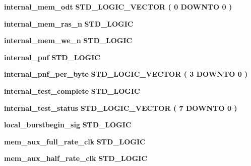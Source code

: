 \begin{DoxyCompactItemize}
\item 
{\bf internal\+\_\+mem\+\_\+odt} {\bfseries \textcolor{comment}{S\+T\+D\+\_\+\+L\+O\+G\+I\+C\+\_\+\+V\+E\+C\+T\+OR}\textcolor{vhdlchar}{ }\textcolor{vhdlchar}{(}\textcolor{vhdlchar}{ }\textcolor{vhdlchar}{ } \textcolor{vhdldigit}{0} \textcolor{vhdlchar}{ }\textcolor{keywordflow}{D\+O\+W\+N\+TO}\textcolor{vhdlchar}{ }\textcolor{vhdlchar}{ } \textcolor{vhdldigit}{0} \textcolor{vhdlchar}{ }\textcolor{vhdlchar}{)}\textcolor{vhdlchar}{ }} 
\item 
{\bf internal\+\_\+mem\+\_\+ras\+\_\+n} {\bfseries \textcolor{comment}{S\+T\+D\+\_\+\+L\+O\+G\+IC}\textcolor{vhdlchar}{ }} 
\item 
{\bf internal\+\_\+mem\+\_\+we\+\_\+n} {\bfseries \textcolor{comment}{S\+T\+D\+\_\+\+L\+O\+G\+IC}\textcolor{vhdlchar}{ }} 
\item 
{\bf internal\+\_\+pnf} {\bfseries \textcolor{comment}{S\+T\+D\+\_\+\+L\+O\+G\+IC}\textcolor{vhdlchar}{ }} 
\item 
{\bf internal\+\_\+pnf\+\_\+per\+\_\+byte} {\bfseries \textcolor{comment}{S\+T\+D\+\_\+\+L\+O\+G\+I\+C\+\_\+\+V\+E\+C\+T\+OR}\textcolor{vhdlchar}{ }\textcolor{vhdlchar}{(}\textcolor{vhdlchar}{ }\textcolor{vhdlchar}{ } \textcolor{vhdldigit}{3} \textcolor{vhdlchar}{ }\textcolor{keywordflow}{D\+O\+W\+N\+TO}\textcolor{vhdlchar}{ }\textcolor{vhdlchar}{ } \textcolor{vhdldigit}{0} \textcolor{vhdlchar}{ }\textcolor{vhdlchar}{)}\textcolor{vhdlchar}{ }} 
\item 
{\bf internal\+\_\+test\+\_\+complete} {\bfseries \textcolor{comment}{S\+T\+D\+\_\+\+L\+O\+G\+IC}\textcolor{vhdlchar}{ }} 
\item 
{\bf internal\+\_\+test\+\_\+status} {\bfseries \textcolor{comment}{S\+T\+D\+\_\+\+L\+O\+G\+I\+C\+\_\+\+V\+E\+C\+T\+OR}\textcolor{vhdlchar}{ }\textcolor{vhdlchar}{(}\textcolor{vhdlchar}{ }\textcolor{vhdlchar}{ } \textcolor{vhdldigit}{7} \textcolor{vhdlchar}{ }\textcolor{keywordflow}{D\+O\+W\+N\+TO}\textcolor{vhdlchar}{ }\textcolor{vhdlchar}{ } \textcolor{vhdldigit}{0} \textcolor{vhdlchar}{ }\textcolor{vhdlchar}{)}\textcolor{vhdlchar}{ }} 
\item 
{\bf local\+\_\+burstbegin\+\_\+sig} {\bfseries \textcolor{comment}{S\+T\+D\+\_\+\+L\+O\+G\+IC}\textcolor{vhdlchar}{ }} 
\item 
{\bf mem\+\_\+aux\+\_\+full\+\_\+rate\+\_\+clk} {\bfseries \textcolor{comment}{S\+T\+D\+\_\+\+L\+O\+G\+IC}\textcolor{vhdlchar}{ }} 
\item 
{\bf mem\+\_\+aux\+\_\+half\+\_\+rate\+\_\+clk} {\bfseries \textcolor{comment}{S\+T\+D\+\_\+\+L\+O\+G\+IC}\textcolor{vhdlchar}{ }} 

\end{DoxyCompactItemize}
